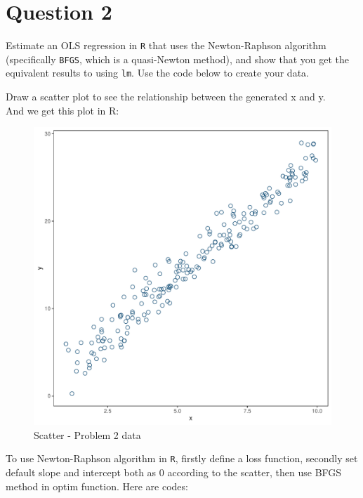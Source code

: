 \documentclass{article} %
\begin{document}
\section*{Question 2}
\noindent Estimate an OLS regression in \texttt{R} that uses the Newton-Raphson algorithm (specifically \texttt{BFGS}, which is a quasi-Newton method), and show that you get the equivalent results to using \texttt{lm}. Use the code below to create your data.
\vspace{.5cm}
 
\vspace{.3cm}
\noindent Draw a scatter plot to see the relationship between the generated x and y. \\
 
\vspace{.3cm}
\noindent And we get this plot in R: \\
\newpage
\begin{figure}[h]
	\centering
	\includegraphics[scale=.5]{q2_plot1.pdf} 
	\caption{Scatter - Problem 2 data}
\end{figure}
\noindent To use Newton-Raphson algorithm in \texttt{R}, firstly define a loss function, secondly set default slope and intercept both as 0 according to the scatter, then use BFGS method in optim function. Here are codes:\\
\end{document}
